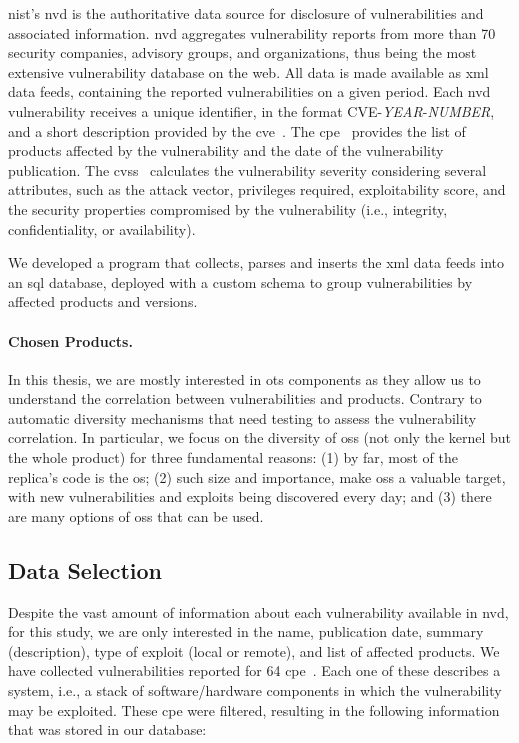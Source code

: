 \gls{nist}'s \gls{nvd} is the authoritative data source for disclosure of vulnerabilities and associated information. 
\gls{nvd} aggregates vulnerability reports from more than 70 security companies, advisory groups, and organizations, thus being the most extensive vulnerability database on the web. 
All data is made available as \gls{xml} data feeds, containing the reported vulnerabilities on a given period. 
Each \gls{nvd} vulnerability receives a unique identifier, in the format CVE-\textit{YEAR}-\textit{NUMBER}, and a short description provided by the \gls{cve}~\cite{cveterm}. 
The \gls{cpe}~\cite{cpe} provides the list of products affected by the vulnerability and the date of the vulnerability publication.
The \gls{cvss}~\cite{cvss} calculates the vulnerability severity considering several attributes, such as the attack vector, privileges required, exploitability score, and the security properties compromised by the vulnerability (i.e., integrity, confidentiality, or availability).


We developed a program that collects, parses and inserts the \gls{xml} data feeds into an \gls{sql} database, deployed with a custom schema to group vulnerabilities by affected products and versions.

\paragraph{Chosen Products.}
In this thesis, we are mostly interested in \gls{ots} components as they allow us to understand the correlation between vulnerabilities and products. 
Contrary to automatic diversity mechanisms that need testing to assess the vulnerability correlation.
In particular, we focus on the diversity of \glspl{os} (not only the kernel but the whole product) for three fundamental reasons: (1) by far, most of the replica’s code is the \gls{os}; (2) such size and importance, make \glspl{os} a valuable target, with new vulnerabilities and exploits being discovered every day; and (3) there are many options of \glspl{os} that can be used.



\subsection{Data Selection}
Despite the vast amount of information about each vulnerability available in \gls{nvd}, for this study, we are only interested in the name, publication date, summary (description), type of exploit (local or remote), and list of affected products.
We have collected vulnerabilities reported for 64 \gls{cpe}~\cite{cpe}.
Each one of these describes a system, i.e., a stack of software/hardware components in which the vulnerability may be exploited.
These \gls{cpe} were filtered, resulting in the following information that was stored in our database:

